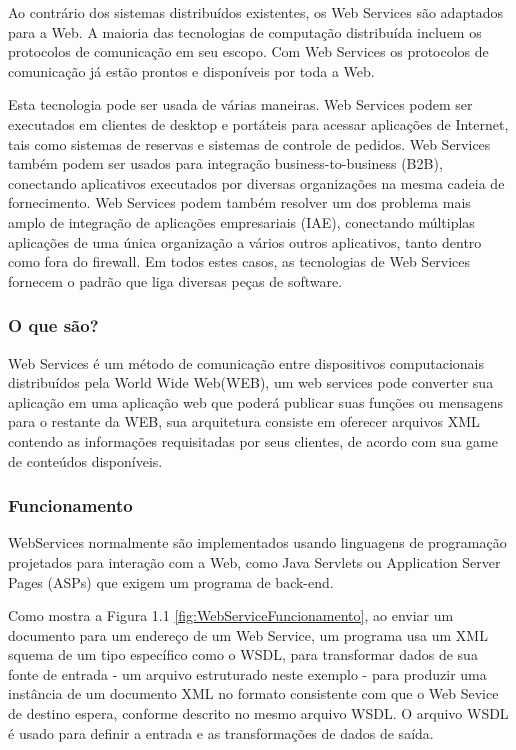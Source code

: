 \documentclass{acm_proc_article-sp}
\begin{document}
		Ao contrário dos sistemas distribuídos existentes, os Web Services são adaptados para a Web. A maioria das tecnologias de computação distribuída incluem os protocolos de comunicação em seu escopo. Com Web Services os protocolos de comunicação já estão prontos e disponíveis por toda a Web. 
		
		Esta tecnologia pode ser usada de várias maneiras. Web Services podem ser executados em clientes de desktop e portáteis para acessar aplicações de Internet, tais como sistemas de reservas e sistemas de controle de pedidos. Web Services também podem ser usados para integração business-to-business (B2B), conectando aplicativos executados por diversas organizações na mesma cadeia de fornecimento. Web Services podem também resolver um dos problema mais amplo de integração de aplicações empresariais (IAE), conectando múltiplas aplicações de uma única organização a vários outros aplicativos, tanto dentro como fora do firewall. Em todos estes casos, as tecnologias de Web Services fornecem o padrão que liga diversas peças de software.\cite{UNDERWEBSERVICES}
		
		\subsubsection{O que são?}
			Web Services é um método de comunicação entre dispositivos computacionais distribuídos pela World Wide Web(WEB), um web services pode converter sua aplicação em uma aplicação web que poderá publicar suas funções ou mensagens para o restante da WEB, sua arquitetura consiste em oferecer arquivos XML contendo as informações requisitadas por seus clientes, de acordo com sua game de conteúdos disponíveis.\cite{WEBS}
		
		\subsubsection{Funcionamento}
		
			WebServices normalmente são implementados usando linguagens de programação projetados para interação com a Web, como Java Servlets ou Application Server Pages (ASPs) que exigem um programa de back-end.
		
			Como mostra a Figura 1.1 \ref{fig:WebServiceFuncionamento}, ao enviar um documento para um endereço de um Web Service, um programa usa um XML squema de um tipo específico como o WSDL, para transformar dados de sua fonte de entrada - um arquivo estruturado neste exemplo - para produzir uma instância de um documento XML no formato consistente com que o Web Sevice de destino espera, conforme descrito no mesmo arquivo WSDL. O arquivo WSDL é usado para definir a entrada e as transformações de dados de saída.
		
\end{document}

